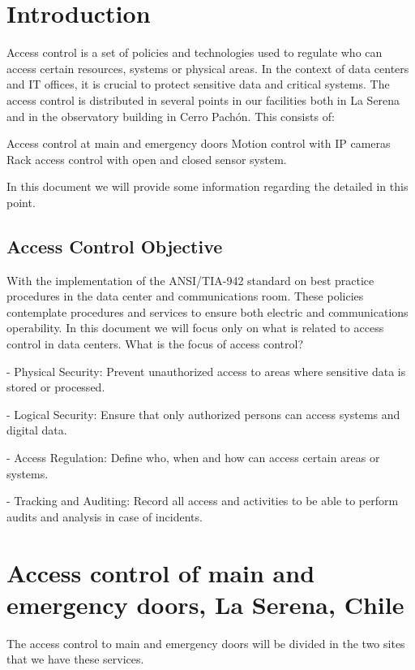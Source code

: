 \section{Introduction}

Access control is a set of policies and technologies used to regulate who can access certain resources, systems or physical areas. In the context of data centers and IT offices, it is crucial to protect sensitive data and critical systems.
The access control is distributed in several points in our facilities both in La Serena and in the observatory building in Cerro Pachón.
This consists of:

Access control at main and emergency doors
Motion control with IP cameras
Rack access control with open and closed sensor system.

In this document we will provide some information regarding the detailed in this point.


\subsection{Access Control Objective}

With the implementation of the ANSI/TIA-942 standard on best practice procedures in the data center and communications room. These policies contemplate procedures and services to ensure both electric and communications operability. In this document we will focus only on what is related to access control in data centers.
What is the focus of access control?

- Physical Security: Prevent unauthorized access to areas where sensitive data is stored or processed.

- Logical Security: Ensure that only authorized persons can access systems and digital data.

- Access Regulation: Define who, when and how can access certain areas or systems.

- Tracking and Auditing: Record all access and activities to be able to perform audits and analysis in case of incidents.



\section{Access control of main and emergency doors, La Serena, Chile}

The access control to main and emergency doors will be divided in the two sites that we have these services.

